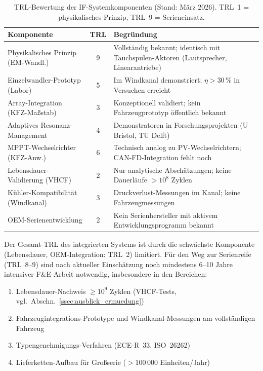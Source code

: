 ﻿\documentclass[12pt, a4paper]{report}
\theoremstyle{definition}
\theoremstyle{remark}
\begin{document}
\begin{table}[H]
  \centering
  \caption{TRL-Bewertung der IF-Systemkomponenten (Stand: März 2026).
           TRL~1 = physikalisches Prinzip, TRL~9 = Serieneinsatz.}
  \label{tab:trl}
  \begin{tabular}{lc>{\raggedright\arraybackslash}p{6.8cm}}
    \toprule
    Komponente & TRL & Begründung \\
    \midrule
    Physikalisches Prinzip (EM-Wandl.)   & 9 &
      Vollständig bekannt; identisch mit Tauchspulen-Aktoren (Lautsprecher,
      Linearantriebe) \\
    Einzelwandler-Prototyp (Labor)         & 5 &
      Im Windkanal demonstriert; $\eta > 30\,\%$ in Versuchen erreicht \\
    Array-Integration (KFZ-Maßstab)       & 3 &
      Konzeptionell validiert; kein Fahrzeugprototyp öffentlich bekannt \\
    Adaptives Resonanz-Management         & 4 &
      Demonstratoren in Forschungsprojekten (U Bristol, TU Delft) \\
    MPPT-Wechselrichter (KFZ-Anw.)   & 6 &
      Technisch analog zu PV-Wechselrichtern; CAN-FD-Integration fehlt noch \\
    Lebensdauer-Validierung (VHCF)        & 2 &
      Nur analytische Abschätzungen; keine Dauerläufe $> 10^8$ Zyklen \\
    Kühler-Kompatibilität (Windkanal)     & 3 &
      Druckverlust-Messungen im Kanal; keine Fahrzeugmessungen \\
    OEM-Serienentwicklung                 & 2 &
      Kein Serienhersteller mit aktivem Entwicklungsprogramm bekannt \\
    \bottomrule
  \end{tabular}
\end{table}

Der Gesamt-TRL des integrierten Systems ist durch die schwächste Komponente
(Lebensdauer, OEM-Integration: TRL~2) limitiert. Für den Weg zur Serienreife
(TRL~8--9) sind nach aktueller Einschätzung noch mindestens 6--10 Jahre
intensiver F\&E-Arbeit notwendig, insbesondere in den Bereichen:

\begin{enumerate}[leftmargin=2em]
  \item Lebensdauer-Nachweis $\geq 10^9$ Zyklen (VHCF-Tests, vgl.\
        Abschn.~\ref{ssec:ausblick_ermuedung})
  \item Fahrzeugintegrations-Prototype und Windkanal-Messungen am
        vollständigen Fahrzeug
  \item Typengenehmigungs-Verfahren (ECE-R~33, ISO~26262)
  \item Lieferketten-Aufbau für Groß\-serie ($> 100\,000$ Einheiten/Jahr)
\end{enumerate}
\end{document}
